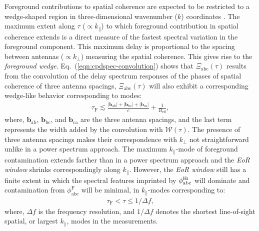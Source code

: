 \documentclass[
reprint,
superscriptaddress,
amsmath,
amssymb,
aps,
]{revtex4-1}
\begin{document}

Foreground contributions to spatial coherence are expected to be restricted to a wedge-shaped region in three-dimensional wavenumber ($k$) coordinates \cite{bow09,liu09,liu14a,liu14b,dat10,liu11,gho12,mor12,par12b,tro12,ved12,dil13,pob13,thy13,thy15a,thy15b,thy16,dil14}. The maximum extent along $\tau$ ($\propto k_\parallel$) to which foreground contribution in spatial coherence extends is a direct measure of the fastest spectral variation in the foreground component. This maximum delay is proportional to the spacing between antennas ($\propto k_\perp$) measuring the spatial coherence. This gives rise to the {\it foreground wedge}. Eq.~(\ref{eqn:cpdspec-convolution}) shows that $\Xi_\textrm{abc}(\tau)$ results from the convolution of the delay spectrum responses of the phases of spatial coherence of three antenna spacings, $\Xi_\textrm{abc}(\tau)$ will also exhibit a corresponding wedge-like behavior corresponding to modes:
\begin{align}
  \tau_\textrm{F} \lesssim \frac{|\bm{b}_\textrm{ab}| + |\bm{b}_\textrm{bc}| + |\bm{b}_\textrm{ca}|}{c} + \frac{1}{B_\textrm{eff}}, \label{eqn:cp-FG-wedge}
\end{align}
where, $\bm{b}_\textrm{ab}$, $\bm{b}_\textrm{bc}$, and $\bm{b}_\textrm{ca}$ are the three antenna spacings, and the last term represents the width added by the convolution with $\mathcal{W}(\tau)$. The presence of three antenna spacings makes their correspondence with $k_\perp$ not straightforward unlike in a power spectrum approach. The maximum $k_\parallel$-mode of foreground contamination extends farther than in a power spectrum approach and the {\it EoR window} shrinks  correspondingly along $k_\parallel$. However, the {\it EoR window} still has a finite extent in which the spectral features imprinted by $\phi_\textrm{abc}^\textrm{H{\sc i}}$ will dominate and contamination from $\phi_\textrm{abc}^\textrm{F}$ will be minimal, in $k_\parallel$-modes corresponding to:
\begin{align}
  \tau_\textrm{F} < \tau \leq 1/\Delta f, \label{eqn:cp-EoR-window}
\end{align}
where, $\Delta f$ is the frequency resolution, and $1/\Delta f$ denotes the shortest line-of-sight spatial, or largest $k_\parallel$, modes in the measurements.
\end{document}
